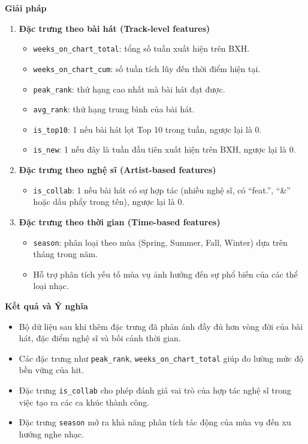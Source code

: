 \textbf{Giải pháp} 
\begin{enumerate}[label=\arabic*]
    \item \textbf{Đặc trưng theo bài hát (Track-level features)}
    \begin{itemize}
        \item \texttt{weeks\_on\_chart\_total}: tổng số tuần xuất hiện trên BXH.
        \item \texttt{weeks\_on\_chart\_cum}: số tuần tích lũy đến thời điểm hiện tại.
        \item \texttt{peak\_rank}: thứ hạng cao nhất mà bài hát đạt được.
        \item \texttt{avg\_rank}: thứ hạng trung bình của bài hát.
        \item \texttt{is\_top10}: 1 nếu bài hát lọt Top 10 trong tuần, ngược lại là 0.
        \item \texttt{is\_new}: 1 nếu đây là tuần đầu tiên xuất hiện trên BXH, ngược lại là 0.
    \end{itemize}

    \item \textbf{Đặc trưng theo nghệ sĩ (Artist-based features)}
    \begin{itemize}
        \item \texttt{is\_collab}: 1 nếu bài hát có sự hợp tác (nhiều nghệ sĩ, có “feat.”, “\&” hoặc dấu phẩy trong tên), 
        ngược lại là 0.
    \end{itemize}

    \item \textbf{Đặc trưng theo thời gian (Time-based features)}
    \begin{itemize}
        \item \texttt{season}: phân loại theo mùa (Spring, Summer, Fall, Winter) dựa trên tháng trong năm.
        \item Hỗ trợ phân tích yếu tố mùa vụ ảnh hưởng đến sự phổ biến của các thể loại nhạc.
    \end{itemize}
\end{enumerate}

\textbf{Kết quả và Ý nghĩa} 

\begin{itemize}
    \item Bộ dữ liệu sau khi thêm đặc trưng đã phản ánh đầy đủ hơn vòng đời của bài hát, đặc điểm nghệ sĩ và bối cảnh thời gian.
    \item Các đặc trưng như \texttt{peak\_rank}, \texttt{weeks\_on\_chart\_total} giúp đo lường mức độ bền vững của hit. 
    \item Đặc trưng \texttt{is\_collab} cho phép đánh giá vai trò của hợp tác nghệ sĩ trong việc tạo ra các ca khúc thành công.
    \item Đặc trưng \texttt{season} mở ra khả năng phân tích tác động của mùa vụ đến xu hướng nghe nhạc.
\end{itemize}

